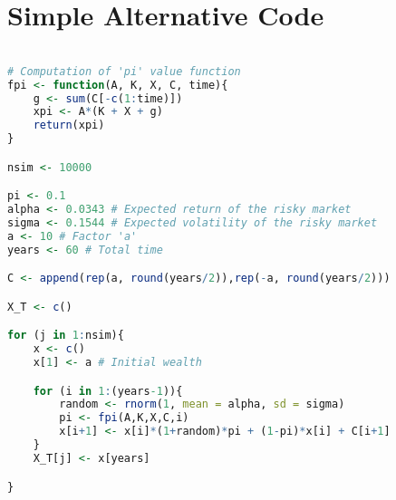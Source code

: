 \section{Simple Alternative Code}\label{ap:alt-simple}

\begin{lstlisting}[language = R]

# Computation of 'pi' value function
fpi <- function(A, K, X, C, time){
	g <- sum(C[-c(1:time)])
	xpi <- A*(K + X + g)
	return(xpi)
}

nsim <- 10000

pi <- 0.1
alpha <- 0.0343 # Expected return of the risky market
sigma <- 0.1544 # Expected volatility of the risky market
a <- 10 # Factor 'a'
years <- 60 # Total time

C <- append(rep(a, round(years/2)),rep(-a, round(years/2)))

X_T <- c()

for (j in 1:nsim){
	x <- c()
	x[1] <- a # Initial wealth

	for (i in 1:(years-1)){
		random <- rnorm(1, mean = alpha, sd = sigma)
		pi <- fpi(A,K,X,C,i)
		x[i+1] <- x[i]*(1+random)*pi + (1-pi)*x[i] + C[i+1]
	}
	X_T[j] <- x[years]

}
\end{lstlisting}
